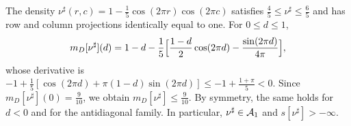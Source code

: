 \begin{observacion}\label{obs:slater}\leavevmode\par\noindent The density $\nu^\sharp(r,c)=1-\frac15\cos(2\pi
r)\cos(2\pi c)$ satisfies $\frac45\le\nu^\sharp\le\frac65$ and has row and column projections identically equal to one. For $0\le
d\le1$, \[
 m_D[\nu^\sharp](d)=1-d-\frac15\Bigl[\frac{1-d}2\cos(2\pi d)-\frac{\sin(2\pi d)}{4\pi}\Bigr],
\] whose derivative is $-1+\frac15[\cos(2\pi d)+\pi(1-d)\sin(2\pi d)]\le-1+\frac{1+\pi}5<0$. Since $m_D[\nu^\sharp](0)=\frac9{10}$, we
obtain $m_D[\nu^\sharp]\le\frac9{10}$. By symmetry, the same holds for $d<0$ and for the antidiagonal family. In particular,
$\nu^\sharp\in{\mathcal{A}}_1$ and $s[\nu^\sharp]>-\infty$. \end{observacion}
